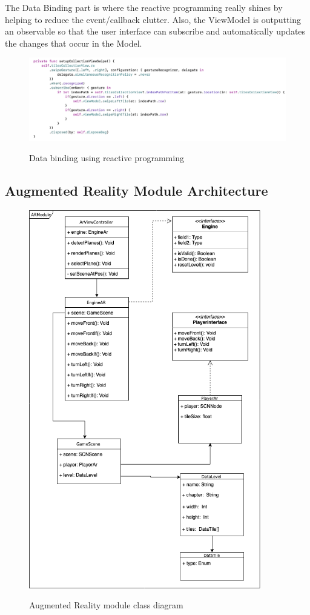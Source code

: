 \documentclass[12 pct]{report}
\begin{document}
The Data Binding part is where the reactive programming really shines by helping to reduce the event/callback clutter. Also, the ViewModel is outputting an observable so that the user interface can subscribe and automatically updates the changes that occur in the Model.


\begin{figure}[H]
\includegraphics[width=1.0\textwidth]{reactive-ui}
\centering
\label{fig:reactive-repository}
\caption{Data binding using reactive programming}
\end{figure}

\subsection*{Augmented Reality Module Architecture}

\begin{figure}[H]
\includegraphics[width=0.9\textwidth]{ArRobotCodeUML}
\centering
\label{fig:feature-points}
\caption{ Augmented Reality module class diagram }
\end{figure}
\end{document}
